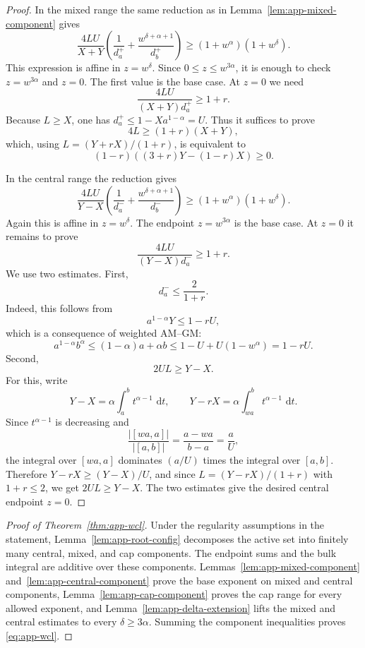 \documentclass[pdflatex,sn-mathphys-num]{sn-jnl}
\numberwithin{equation}{section}
\theoremstyle{thmstyleone}
\theoremstyle{thmstylethree}
\newcommand{\1}{\mathbf{1}}
\newcommand{\dd}{\,\mathrm{d}}
\begin{document}
\begin{proof}
In the mixed range the same reduction as in Lemma~\ref{lem:app-mixed-component} gives
\[
 \frac{4LU}{X+Y}\left(\frac1{d_a^+}+\frac{w^{\delta+\alpha+1}}{d_b^+}\right)
 \ge (1+w^\alpha)(1+w^\delta).
\]
This expression is affine in $z=w^\delta$. Since $0\le z\le w^{3\alpha}$, it is enough to check $z=w^{3\alpha}$ and $z=0$. The first value is the base case. At $z=0$ we need
\[
 \frac{4LU}{(X+Y)d_a^+}\ge1+r.
\]
Because $L\ge X$, one has $d_a^+\le1-Xa^{1-\alpha}=U$. Thus it suffices to prove
\[
 4L\ge(1+r)(X+Y),
\]
which, using $L=(Y+rX)/(1+r)$, is equivalent to
\[
 (1-r)((3+r)Y-(1-r)X)\ge0.
\]

In the central range the reduction gives
\[
 \frac{4LU}{Y-X}\left(\frac1{d_a^-}+\frac{w^{\delta+\alpha+1}}{d_b^-}\right)
 \ge (1+w^\alpha)(1+w^\delta).
\]
Again this is affine in $z=w^\delta$. The endpoint $z=w^{3\alpha}$ is the base case. At $z=0$ it remains to prove
\[
 \frac{4LU}{(Y-X)d_a^-}\ge1+r.
\]
We use two estimates. First,
\[
 d_a^-\le\frac2{1+r}.
\]
Indeed, this follows from
\[
 a^{1-\alpha}Y\le1-rU,
\]
which is a consequence of weighted AM--GM:
\[
 a^{1-\alpha}b^\alpha\le(1-\alpha)a+\alpha b\le1-U+U(1-w^\alpha)=1-rU.
\]
Second,
\[
 2UL\ge Y-X.
\]
For this, write
\[
 Y-X=\alpha\int_a^b t^{\alpha-1}\,\dd t,
 \qquad
 Y-rX=\alpha\int_{wa}^{b} t^{\alpha-1}\,\dd t.
\]
Since $t^{\alpha-1}$ is decreasing and
\[
 \frac{|[wa,a]|}{|[a,b]|}=\frac{a-wa}{b-a}=\frac aU,
\]
the integral over $[wa,a]$ dominates $(a/U)$ times the integral over $[a,b]$. Therefore $Y-rX\ge(Y-X)/U$, and since $L=(Y-rX)/(1+r)$ with $1+r\le2$, we get $2UL\ge Y-X$. The two estimates give the desired central endpoint $z=0$.
\end{proof}

\begin{proof}[Proof of Theorem~\ref{thm:app-wcl}]
Under the regularity assumptions in the statement,
Lemma~\ref{lem:app-root-config} decomposes the active set into finitely
many central, mixed, and cap components. The endpoint sums and the bulk
integral are additive over these components.
Lemmas~\ref{lem:app-mixed-component} and~\ref{lem:app-central-component} prove the base exponent on mixed and
central components, Lemma~\ref{lem:app-cap-component} proves the cap
range for every allowed exponent, and
Lemma~\ref{lem:app-delta-extension} lifts the mixed and central
estimates to every $\delta\ge3\alpha$. Summing the component
inequalities proves \eqref{eq:app-wcl}.
\end{proof}
\end{document}

